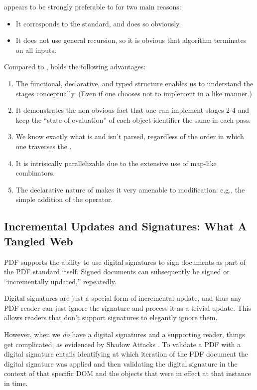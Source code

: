 \ssp{} appears to be strongly preferable to \dsp for two main reasons:
\begin{itemize}
\item It corresponds to the standard, and does so obviously.
\item It does not use general recursion, so it is obvious that \ssp{}
  algorithm terminates on all inputs.
\end{itemize}
Compared to \dsp{}, \ssp{} holds the following advantages:
\begin{enumerate}
\item The functional, declarative, and typed structure enables
  us to understand the stages conceptually.  (Even if one chooses
  not to implement in a like manner.)
\item It demonstrates the non obvious fact that one can
  implement stages 2-4 and keep the ``state of evaluation'' of each
  object identifier the same in each pass.
\item We know exactly what is and isn't parsed, regardless of the
  order in which one traverses the .
\item It is intrisically parallelizable due to the extensive use of
  map-like combinators.
\item The declarative nature of \ssp{} makes it very amenable to
  modification: e.g., the simple addition of the 
  operator.
\end{enumerate}


\subsection{Incremental Updates and Signatures: What A Tangled Web}
\label{sec:updates-and-signatures}

PDF supports the ability to use digital signatures to sign documents
as part of the PDF standard itself.  Signed documents can
subsequently be signed or ``incrementally updated,'' repeatedly.

Digital signatures are just a special form of incremental update, and
thus any PDF reader can just ignore the signature and process it as a
trivial update.  This allows readers that don't support signatures to
elegantly ignore them.

However, when we \emph{do} have a digital signatures and a supporting
reader, things get complicated, as evidenced by Shadow Attacks
\cite{mladenovTrillionDollarRefund2019,ndsssymposiumNDSS2021Shadow2021}.
%
To validate a PDF with a digital signature entails identifying at
which iteration of the PDF document the digital signature was applied
and then validating the digital signature in the context of that
specific DOM and the objects that were in effect at that instance in
time.

